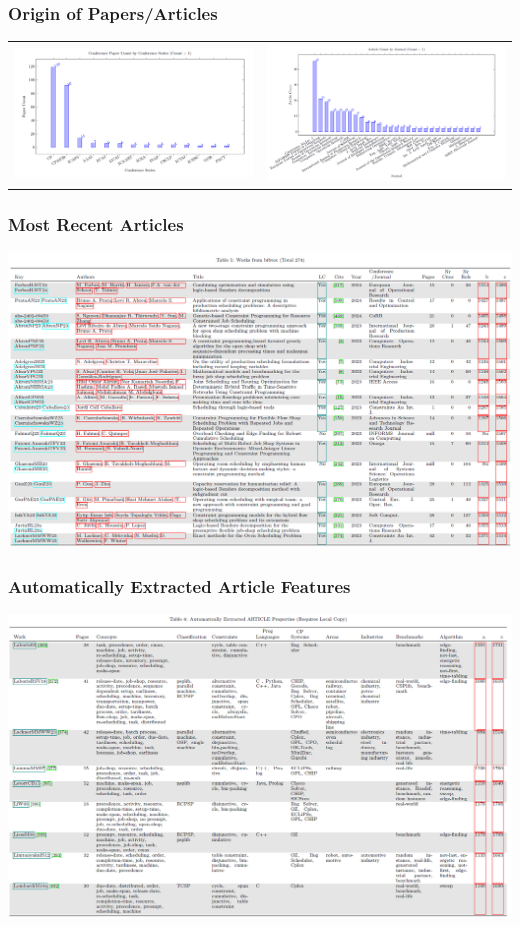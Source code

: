 \begin{frame}
\frametitle{Origin of Papers/Articles}
\begin{tabular}[t]{cc}
\includegraphics[width=.45\textwidth]{survey/conferences}
& 
\includegraphics[width=.55\textwidth]{survey/journals}
\end{tabular}
\end{frame}

\begin{frame}
\frametitle{Most Recent Articles}
\includegraphics[width=\textwidth]{survey/mostrecentarticles}
\end{frame}

\begin{frame}
\frametitle{Automatically Extracted Article Features}
\includegraphics[width=\textwidth]{survey/extracted}
\end{frame}

